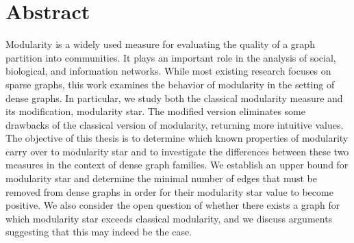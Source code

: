 \documentclass[letterpaper,12pt]{article}
\begin{document}
\section*{Abstract}
Modularity is a widely used measure for evaluating the quality of a graph partition into communities. It plays an important role in the analysis of social, biological, and information networks. While most existing research focuses on sparse graphs, this work examines the behavior of modularity in the setting of dense graphs. In particular, we study both the classical modularity measure and its modification, modularity star. The modified version eliminates some drawbacks of the classical version of modularity, returning more intuitive values.\\
\indent The objective of this thesis is to determine which known properties of modularity carry over to modularity star and to investigate the differences between these two measures in the context of dense graph families. We establish an upper bound for modularity star and determine the minimal number of edges that must be removed from dense graphs in order for their modularity star value to become positive. We also consider the open question of whether there exists a graph for which modularity star exceeds classical modularity, and we discuss arguments suggesting that this may indeed be the case.

\newpage
\tableofcontents
\newpage
\end{document}
